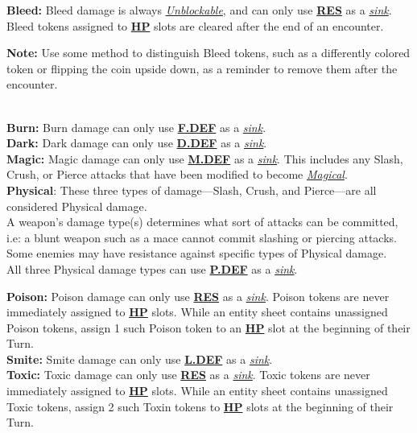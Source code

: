 \documentclass[12pt]{article}
\newcommand{\refto}[1]{\hyperlink{#1}{\textbf{#1}}}
\newcommand{\reftoit}[1]{\hyperlink{#1}{\emph{#1}}}
\begin{document}
\begin{multicols*}{2}
\textbf{Bleed:} Bleed damage is always \reftoit{Unblockable}, and can only use \refto{RES} as a \reftoit{sink}.\\
Bleed tokens assigned to \refto{HP} slots are cleared after the end of an encounter.

\begin{tcolorbox}
\textbf{Note:} Use some method to distinguish Bleed tokens, such as a differently colored token or flipping the coin upside down, as a reminder to remove them after the encounter.
\end{tcolorbox}
\ \\
\textbf{Burn:} Burn damage can only use \refto{F.DEF} as a \reftoit{sink}.\\

\textbf{Dark:} Dark damage can only use \refto{D.DEF} as a \reftoit{sink}.\\

\textbf{Magic:} Magic damage can only use \refto{M.DEF} as a \reftoit{sink}. This includes any Slash, Crush, or Pierce attacks that have been modified to become \reftoit{Magical}.\\

\textbf{Physical}: These three types of damage—Slash, Crush, and Pierce—are all considered Physical damage.\\
A weapon’s damage type(s) determines what sort of attacks can be committed, i.e: a blunt weapon such as a mace cannot commit slashing or piercing attacks.\\
Some enemies may have resistance against specific types of Physical damage.\\
All three Physical damage types can use \refto{P.DEF} as a \reftoit{sink}.

\columnbreak

\textbf{Poison:} Poison damage can only use \refto{RES} as a \reftoit{sink}. Poison tokens are never immediately assigned to \refto{HP} slots. While an entity sheet contains unassigned Poison tokens, assign 1 such Poison token to an \refto{HP} slot at the beginning of their Turn.\\

\textbf{Smite:} Smite damage can only use \refto{L.DEF} as a \reftoit{sink}.\\

\textbf{Toxic:} Toxic damage can only use \refto{RES} as a \reftoit{sink}. Toxic tokens are never immediately assigned to \refto{HP} slots. While an entity sheet contains unassigned Toxic tokens, assign 2 such Toxin tokens to \refto{HP} slots at the beginning of their Turn.


\end{multicols*}
\end{document}
